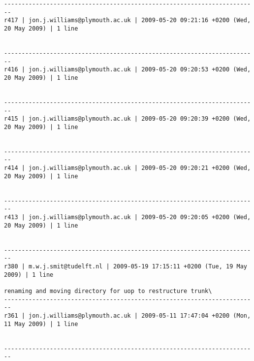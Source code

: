 \documentclass[9]{report}
\begin{document}
\begin{description}
\begin{verbatim}
------------------------------------------------------------------------
r417 | jon.j.williams@plymouth.ac.uk | 2009-05-20 09:21:16 +0200 (Wed, 20 May 2009) | 1 line


------------------------------------------------------------------------
r416 | jon.j.williams@plymouth.ac.uk | 2009-05-20 09:20:53 +0200 (Wed, 20 May 2009) | 1 line


------------------------------------------------------------------------
r415 | jon.j.williams@plymouth.ac.uk | 2009-05-20 09:20:39 +0200 (Wed, 20 May 2009) | 1 line


------------------------------------------------------------------------
r414 | jon.j.williams@plymouth.ac.uk | 2009-05-20 09:20:21 +0200 (Wed, 20 May 2009) | 1 line


------------------------------------------------------------------------
r413 | jon.j.williams@plymouth.ac.uk | 2009-05-20 09:20:05 +0200 (Wed, 20 May 2009) | 1 line


------------------------------------------------------------------------
r380 | m.w.j.smit@tudelft.nl | 2009-05-19 17:15:11 +0200 (Tue, 19 May 2009) | 1 line

renaming and moving directory for uop to restructure trunk\
------------------------------------------------------------------------
r361 | jon.j.williams@plymouth.ac.uk | 2009-05-11 17:47:04 +0200 (Mon, 11 May 2009) | 1 line


------------------------------------------------------------------------


\end{verbatim}
\end{description}
\end{document}
